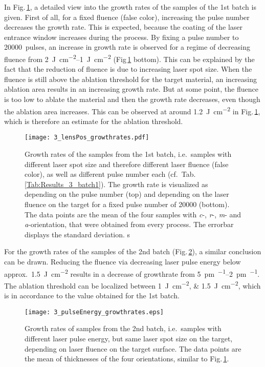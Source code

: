 
In Fig.\,\ref{Fig:Results_3_lensGrowthRate}, a detailed view into the growth rates of the samples of the 1st batch is given.
First of all, for a fixed fluence (false color), increasing the pulse number decreases the growth rate.
This is expected, because the coating of the laser entrance window increases during the process.
By fixing a pulse number to \qty{20000}{pulses}, an increase in growth rate is observed for a regime of decreasing fluence from \qtyrange{2}{1}{\joule\per\cm\squared} (Fig\,\ref{Fig:Results_3_lensGrowthRate} bottom).
This can be explained by the fact that the reduction of fluence is due to increasing laser spot size.
When the fluence is still above the ablation threshold for the target material, an increasing ablation area results in an increasing growth rate.
But at some point, the fluence is too low to ablate the material and then the growth rate decreases, even though the ablation area increases.
This can be observed at around \qty{1.2}{\joule\per\cm\squared} in Fig.\,\ref{Fig:Results_3_lensGrowthRate}, which is therefore an estimate for the ablation threshold.
\begin{figure}
    \centering
    \texttt{[image: 3\_lensPos\_growthrates.pdf]}
    \caption{
    Growth rates of the samples from the 1st batch, i.e.\ samples with different laser spot size and therefore different laser fluence (false color), as well as different pulse number each (cf.\ Tab.\,\ref{Tab:Results_3_batch1}).
    The growth rate is visualized as depending on the pulse number (top) and depending on the laser fluence on the target for a fixed pulse number of \qty{20000}{} (bottom).
    The data points are the mean of the four samples with \textit{c}-, \textit{r}-, \textit{m}- and \textit{a}-orientation, that were obtained from every process.
    The errorbar displays the standard deviation.
s    }
    \label{Fig:Results_3_lensGrowthRate}
\end{figure}
%
For the growth rates of the samples of the 2nd batch (Fig.\,\ref{Fig:Results_3_pulseGrowthRate}), a similar conclusion can be drawn.
Reducing the fluence via decreasing laser pulse energy below approx.\ \qty{1.5}{\joule\per\cm\squared} results in a decrease of growthrate from \qtyrange{5}{2}{\pm\per\pulse}.
The ablation threshold can be localized between \qtylist{1;1.5}{\joule\per\cm\squared}, which is in accordance to the value obtained for the 1st batch.
\begin{figure}
    \centering
    \texttt{[image: 3\_pulseEnergy\_growthrates.eps]}
    \caption{Growth rates of samples from the 2nd batch, i.e.\ samples with different laser pulse energy, but same laser spot size on the target, depending on laser fluence on the target surface.
    The data points are the mean of thicknesses of the four orientations, similar to Fig.\,\ref{Fig:Results_3_lensGrowthRate}.}
    \label{Fig:Results_3_pulseGrowthRate}
\end{figure}